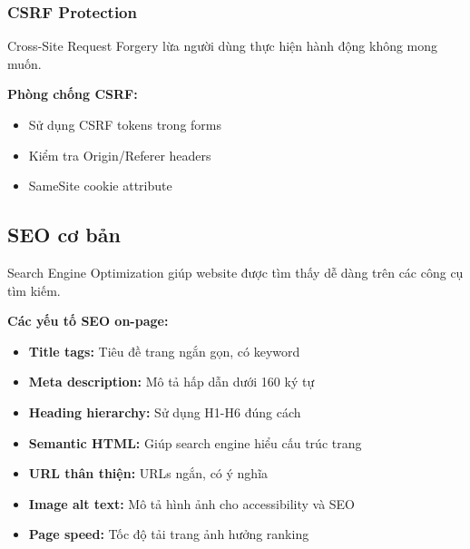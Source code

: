 \subsubsection{CSRF Protection}

Cross-Site Request Forgery lừa người dùng thực hiện hành động không mong muốn.

\textbf{Phòng chống CSRF:}
\begin{itemize}
    \item Sử dụng CSRF tokens trong forms
    \item Kiểm tra Origin/Referer headers
    \item SameSite cookie attribute
\end{itemize}

\subsection{SEO cơ bản}

Search Engine Optimization giúp website được tìm thấy dễ dàng trên các công cụ tìm kiếm.

\textbf{Các yếu tố SEO on-page:}
\begin{itemize}
    \item \textbf{Title tags:} Tiêu đề trang ngắn gọn, có keyword
    \item \textbf{Meta description:} Mô tả hấp dẫn dưới 160 ký tự
    \item \textbf{Heading hierarchy:} Sử dụng H1-H6 đúng cách
    \item \textbf{Semantic HTML:} Giúp search engine hiểu cấu trúc trang
    \item \textbf{URL thân thiện:} URLs ngắn, có ý nghĩa
    \item \textbf{Image alt text:} Mô tả hình ảnh cho accessibility và SEO
    \item \textbf{Page speed:} Tốc độ tải trang ảnh hưởng ranking
\end{itemize}
